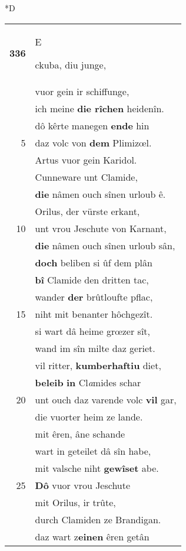 \documentclass[8pt,a4paper,notitlepage]{article}
\begin{document}
\begin{table}[ht]
\begin{minipage}[t]{0.5\linewidth}
\small
\begin{center}*D
\end{center}
\begin{tabular}{rl}
\textbf{336} & \begin{large}E\end{large}ckuba, diu junge,\\ 
 & vuor gein ir schiffunge,\\ 
 & ich meine \textbf{die rîchen} heidenîn.\\ 
 & dô kêrte manegen \textbf{ende} hin\\ 
5 & daz volc von \textbf{dem} Plimizœl.\\ 
 & Artus vuor gein Karidol.\\ 
 & Cunneware unt Clamide,\\ 
 & \textbf{die} nâmen ouch sînen urloub ê.\\ 
 & Orilus, der vürste erkant,\\ 
10 & unt vrou Jeschute von Karnant,\\ 
 & \textbf{die} nâmen ouch sînen urloub sân,\\ 
 & \textbf{doch} beliben si ûf dem plân\\ 
 & \textbf{bî} Clamide den dritten tac,\\ 
 & wander \textbf{der} brûtloufte pflac,\\ 
15 & niht mit benanter hôchgezît.\\ 
 & si wart dâ heime grœzer sît,\\ 
 & wand im sîn milte daz geriet.\\ 
 & vil ritter, \textbf{kumberhaftiu} diet,\\ 
 & \textbf{beleib} \textbf{in} Cl\textit{a}mides schar\\ 
20 & unt ouch daz varende volc \textbf{vil} gar,\\ 
 & die vuorter heim ze lande.\\ 
 & mit êren, âne schande\\ 
 & wart in geteilet dâ sîn habe,\\ 
 & mit valsche niht \textbf{gewîset} abe.\\ 
25 & \textbf{Dô} vuor vrou Jeschute\\ 
 & mit Orilus, ir trûte,\\ 
 & durch Clamiden ze Brandigan.\\ 
 & daz wart z\textbf{einen} êren getân\\ 

\end{tabular}
\end{minipage}
\end{table}
\end{document}
